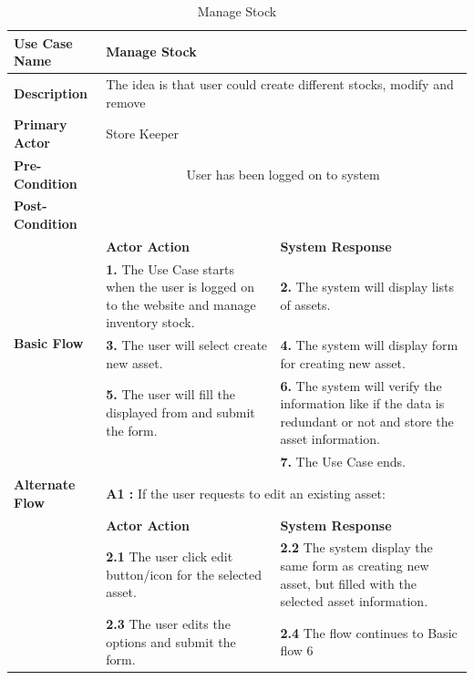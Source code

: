 \begin{table}[!h]
\begin{tabular}{|l|p{6cm}|p{6cm}|}
\hline 
\rule[-1ex]{0pt}{2.5ex} \textbf{Use Case Name} & \multicolumn{2}{p{10cm}|}{Manage Stock} \\ 
\hline 
\rule[-1ex]{0pt}{2.5ex} \textbf{Description} &\multicolumn{2}{p{10cm}|}{The idea is that user could create different stocks, modify and remove} \\ 
\hline 
\rule[-1ex]{0pt}{2.5ex} \textbf{Primary Actor}& \multicolumn{2}{p{10cm}|}{Store Keeper} \\ 
\hline 
\rule[-1ex]{0pt}{2.5ex} \textbf{Pre-Condition} & \multicolumn{2}{c|}{User has been logged on to system} \\ 
\hline 
\rule[-1ex]{0pt}{2.5ex} \textbf{Post-Condition} & \multicolumn{2}{p{10cm}|}{}  \\ 
\hline 
\multirow{4}{*}{\textbf{Basic Flow}} & \textbf{Actor Action} & \textbf{System Response}\\
\cline{2-3}
%
&
\textbf{1.}  The Use Case starts when the user is logged on to the website and manage inventory stock.
& 
\textbf{2.}  The system will display lists of assets.
\\
%
&
\textbf{3.}  The user will select create new asset.
& 
\textbf{4.}  The system will display form for creating new asset. 
\\
%
&
\textbf{5.}  The user will fill the displayed from and submit the form.
& 
\textbf{6.}  The system will verify the information like if the data is redundant or not and store the asset information. 
\\
%
&

& 
\textbf{7.}  The Use Case ends. 
\\
\hline 
\rule[-1ex]{0pt}{2.5ex} \textbf{Alternate Flow} & \multicolumn{2}{p{10cm}|}{\textbf{A1 : } If the user requests to edit an existing asset:}  \\ 
\cline{2-3}
\multirow{2}{*}{} & \textbf{Actor Action} & \textbf{System Response}\\
\cline{2-3}
%
&
\textbf{2.1}  The user click edit button/icon for the selected asset. 
& 
\textbf{2.2}  The system display the same form as creating new asset, but filled with the selected asset information. 
\\
%
&
\textbf{2.3}  The user edits the options and submit the form. 
& 
\textbf{2.4}  The flow continues to Basic flow 6  
\\
\hline
\end{tabular}
\caption{Manage Stock} 
\end{table}

